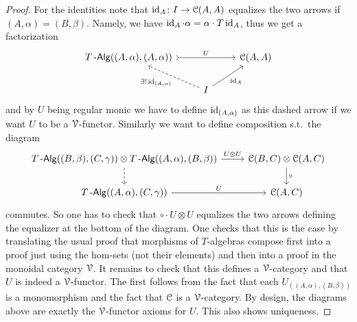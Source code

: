 \documentclass[a4paper,11pt,oneside,openany]{scrbook}
\begin{document}
\begin{proof}
	For the identities note that $\operatorname{id}_A\colon I\to\operatorname{\mathcal{C}}(A,A)$ equalizes the two
    arrows if $(A,\alpha)=(B,\beta)$. Namely, we have
    $\operatorname{id}_A\cdot\alpha=\alpha\cdot T\operatorname{id}_A$, thus we get a factorization
	\[
		\begin{tikzcd}
			T\Alg((A,\alpha),(A,\alpha)) \arrow[rr, tail, "U"] & & \C(A,A)\\
			&  I \ar[ul, dashed, "\exists!\id_{(A,\alpha)}"]\ar[ur, "\id_A"']
		\end{tikzcd}
	\]
	and by $U$ being regular monic we have to define $\operatorname{id}_{(A,\alpha)}$ as this dashed arrow if we want $U$ to be a $\operatorname{\mathcal{V}}$-functor. Similarly we want to define composition s.t.\ the diagram
	\[
		\begin{tikzcd}
			T\Alg((B,\beta),(C,\gamma))\otimes T\Alg((A,\alpha),(B,\beta))\ar[r, "U\otimes U"]\ar[d, dashed]
			& \C(B,C)\otimes\C(A,C)\ar[d, "\circ"] \\
			T\Alg((A,\alpha),(C,\gamma))\ar[r, "U"]
			& \C(A,C)
		\end{tikzcd}
	\]
	commutes. So one has to check that $\circ\cdot U\otimes U$ equalizes the two arrows defining the equalizer at the bottom of the diagram. One checks that this is the case by translating the usual proof that morphisms of $T$-algebras compose first into a proof just using the hom-sets (not their elements) and then into a proof in the monoidal category $\operatorname{\mathcal{V}}$. It remains to check that this defines a $\operatorname{\mathcal{V}}$-category and that $U$ is indeed a $\operatorname{\mathcal{V}}$-functor. The first follows from the fact that each $U_{((A,\alpha),(B,\beta))}$ is a monomorphism and the fact that $\operatorname{\mathcal{C}}$ is a $\operatorname{\mathcal{V}}$-category. By design, the diagrams above are exactly the $\operatorname{\mathcal{V}}$-functor axioms for $U$. This also shows uniqueness.
\end{proof}
\end{document}
